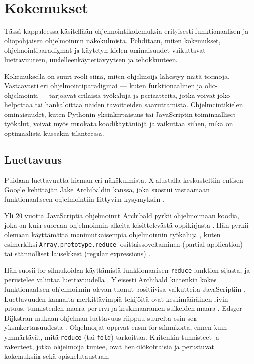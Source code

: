 \vspace{21.5pt}
\chapter{Kokemukset}

Tässä kappaleessa käsitellään ohjelmointikokemuksia erityisesti funktionaalisen ja oliopohjaisen ohjelmoinnin näkökulmista. Pohditaan, miten kokemukset, ohjelmointiparadigmat ja käytetyn kielen ominaisuudet vaikuttavat luettavuuteen, uudelleenkäytettävyyteen ja tehokkuuteen.

Kokemuksella on suuri rooli siinä, miten ohjelmoija lähestyy näitä teemoja. Vastaavasti eri ohjelmointiparadigmat — kuten funktionaalinen ja olio-ohjelmointi — tarjoavat erilaisia työkaluja ja periaatteita, jotka voivat joko helpottaa tai hankaloittaa näiden tavoitteiden saavuttamista. Ohjelmointikielen ominaisuudet, kuten Pythonin yksinkertaisuus tai JavaScriptin toiminnalliset työkalut, voivat myös muokata koodikäytäntöjä ja vaikuttaa siihen, mikä on optimaalista kussakin tilanteessa.

\section{Luettavuus}

Puidaan luettavuutta hieman eri näkökulmista. X-alustalla keskusteltiin entisen Google kehittäjän Jake Archibaldin kanssa, joka suostui vastaamaan funktionaaliseen ohjelmointiin liittyviin kysymyksiin \cite{pennane_x_convo}.

Yli 20 vuotta JavaScriptia ohjelmoinut Archibald pyrkii ohjelmoimaan koodia, joka on kuin suoraan ohjelmoinnin alkeita käsittelevästä oppikirjasta \cite{is_reduce_bad,pennane_fp_gist}. Hän pyrkii olemaan käyttämättä monimutkaisempia ohjelmoinnin työkaluja \cite{is_reduce_bad}, kuten esimerkiksi \texttt{Array.prototype.reduce}, osittaissoveltaminen (partial application) tai säännölliset lausekkeet (regular expressions) \cite{is_reduce_bad,pennane_x_convo}.

Hän suosii for-silmukoiden käyttämistä funktionaalisen \texttt{reduce}-funktion sijasta, ja perustelee valintaa luettavuudella \cite{is_reduce_bad,pennane_x_convo,pennane_fp_gist}. Yleisesti Archibald kuitenkin kokee funktionaalisen ohjelmoinnin olevan tuonut positiivisa vaikutteita JavaScriptiin \cite{pennane_x_convo}. Luettavuuden kannalta merkittävimpiä tekijöitä ovat keskimääräinen rivin pituus, tunnisteiden määrä per rivi ja keskimääräinen sulkeiden määrä \cite[8]{busereadability}. Edsger Dijkstran mukaan ohjelman luettavuus riippuu suurelta osin sen  yksinkertaisuudesta \cite{dijkstra1976discipline}. Ohjelmoijat oppivat ensin for-silmukoita, ennen kuin ymmärtävät, mitä \texttt{reduce} (tai \texttt{fold}) tarkoittaa. Kuitenkin tunnisteet ja rakenteet, jotka ohjelmoija tuntee, ovat henkilökohtaisia ja perustuvat kokemuksiin sekä opiskelutaustaan.

